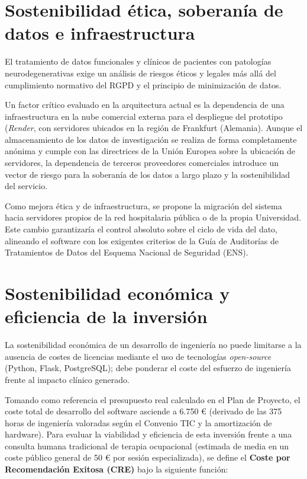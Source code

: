 \section{Sostenibilidad ética, soberanía de datos e infraestructura}
El tratamiento de datos funcionales y clínicos de pacientes con patologías neurodegenerativas exige un análisis de riesgos éticos y legales más allá del cumplimiento normativo del RGPD y el principio de minimización de datos.

Un factor crítico evaluado en la arquitectura actual es la dependencia de una infraestructura en la nube comercial externa para el despliegue del prototipo (\textit{Render}, con servidores ubicados en la región de Frankfurt (Alemania). Aunque el almacenamiento de los datos de investigación se realiza de forma completamente anónima y cumple con las directrices de la Unión Europea sobre la ubicación de servidores, la dependencia de terceros proveedores comerciales introduce un vector de riesgo para la soberanía de los datos a largo plazo y la sostenibilidad del servicio.

Como mejora ética y de infraestructura, se propone la migración del sistema hacia servidores propios de la red hospitalaria pública o de la propia Universidad. Este cambio garantizaría el control absoluto sobre el ciclo de vida del dato, alineando el software con los exigentes criterios de la Guía de Auditorías de Tratamientos de Datos del Esquema Nacional de Seguridad (ENS). \cite{ttech:auditoriaens}

\section{Sostenibilidad económica y eficiencia de la inversión}
La sostenibilidad económica de un desarrollo de ingeniería no puede limitarse a la ausencia de costes de licencias mediante el uso de tecnologías \textit{open-source} (Python, Flask, PostgreSQL); debe ponderar el coste del esfuerzo de ingeniería frente al impacto clínico generado.

Tomando como referencia el presupuesto real calculado en el Plan de Proyecto, el coste total de desarrollo del software asciende a 6.750 € (derivado de las 375 horas de ingeniería valoradas según el Convenio TIC y la amortización de hardware). Para evaluar la viabilidad y eficiencia de esta inversión frente a una consulta humana tradicional de terapia ocupacional (estimada de media en un coste público general de 50 € por sesión especializada), se define el \textbf{Coste por Recomendación Exitosa (CRE)} bajo la siguiente función:

